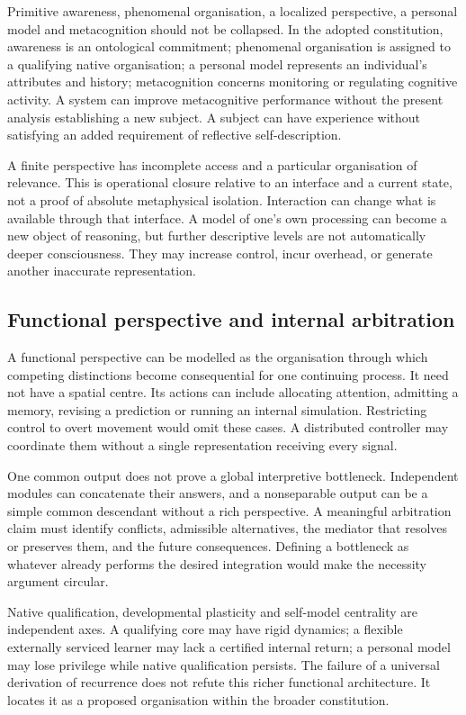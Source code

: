 \documentclass[
  11pt,
  a4paper,
]{article}
\begin{document}
Primitive awareness, phenomenal organisation, a localized perspective, a
personal model and metacognition should not be collapsed. In the adopted
constitution, awareness is an ontological commitment; phenomenal
organisation is assigned to a qualifying native organisation; a personal
model represents an individual's attributes and history; metacognition
concerns monitoring or regulating cognitive activity. A system can
improve metacognitive performance without the present analysis
establishing a new subject. A subject can have experience without
satisfying an added requirement of reflective self-description.

A finite perspective has incomplete access and a particular organisation
of relevance. This is operational closure relative to an interface and a
current state, not a proof of absolute metaphysical isolation.
Interaction can change what is available through that interface. A model
of one's own processing can become a new object of reasoning, but
further descriptive levels are not automatically deeper consciousness.
They may increase control, incur overhead, or generate another
inaccurate representation.

\subsection{Functional perspective and internal
arbitration}\label{functional-perspective-and-internal-arbitration}

A functional perspective can be modelled as the organisation through
which competing distinctions become consequential for one continuing
process. It need not have a spatial centre. Its actions can include
allocating attention, admitting a memory, revising a prediction or
running an internal simulation. Restricting control to overt movement
would omit these cases. A distributed controller may coordinate them
without a single representation receiving every signal.

One common output does not prove a global interpretive bottleneck.
Independent modules can concatenate their answers, and a nonseparable
output can be a simple common descendant without a rich perspective. A
meaningful arbitration claim must identify conflicts, admissible
alternatives, the mediator that resolves or preserves them, and the
future consequences. Defining a bottleneck as whatever already performs
the desired integration would make the necessity argument circular.

Native qualification, developmental plasticity and self-model centrality
are independent axes. A qualifying core may have rigid dynamics; a
flexible externally serviced learner may lack a certified internal
return; a personal model may lose privilege while native qualification
persists. The failure of a universal derivation of recurrence does not
refute this richer functional architecture. It locates it as a proposed
organisation within the broader constitution.
\end{document}

